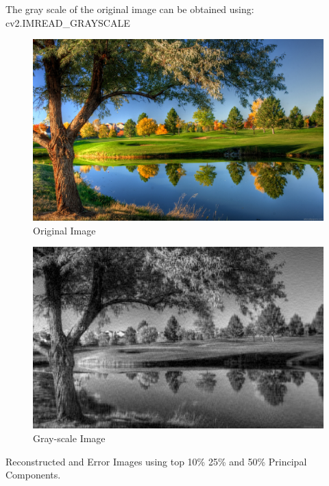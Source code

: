 \documentclass[a4 paper]{article}
\begin{document}
 The gray scale of the original image can be obtained using: cv2.IMREAD\_GRAYSCALE 
\begin{figure}[!htb]
    \centering
    \begin{minipage}{0.49\textwidth}
        \centering
        \includegraphics[width=1\textwidth]{17.jpg} \\
         Original Image
    \end{minipage}\hfill
    \begin{minipage}{0.49\textwidth}
        \centering
        \includegraphics[width=1\textwidth]{grayscale.png}\\
         Gray-scale Image
    \end{minipage}
    \label{fig:l}
\end{figure}


Reconstructed and Error Images using top 10\% 25\% and 50\% Principal Components.\\
\end{document}
